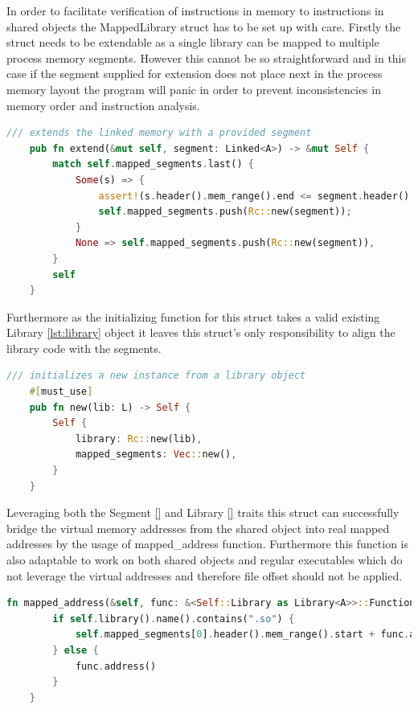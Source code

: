 In order to facilitate verification of instructions in memory to instructions in shared objects the MappedLibrary struct has to be set up with care.
Firstly the struct needs to be extendable as a single library can be mapped to multiple process memory segments.
However this cannot be so straightforward and in this case if the segment supplied for extension does not place next in the process memory layout the program will panic in order to prevent inconsistencies in memory order and instruction analysis.
\begin{lstlisting}[caption=\label{mapped_lib:extend}"The extend function for the MappedLibrary struct", language=Rust, breaklines=true]
/// extends the linked memory with a provided segment
    pub fn extend(&mut self, segment: Linked<A>) -> &mut Self {
        match self.mapped_segments.last() {
            Some(s) => {
                assert!(s.header().mem_range().end <= segment.header().mem_range().start);
                self.mapped_segments.push(Rc::new(segment));
            }
            None => self.mapped_segments.push(Rc::new(segment)),
        }
        self
    }
\end{lstlisting}
Furthermore as the initializing function for this struct takes a valid existing Library \ref{lst:library} object it leaves this struct's only responsibility to align the library code with the segments.
\begin{lstlisting}[caption=\label{mapped_lib:new}"The creator function for the MappedLibrary struct", language=Rust, breaklines=true]
 /// initializes a new instance from a library object
    #[must_use]
    pub fn new(lib: L) -> Self {
        Self {
            library: Rc::new(lib),
            mapped_segments: Vec::new(),
        }
    }
\end{lstlisting}

Leveraging both the Segment \ref{} and Library \ref{} traits this struct can successfully bridge the virtual memory addresses from the shared object into real mapped addresses by the usage of mapped\_address function.
Furthermore this function is also adaptable to work on both shared objects and regular executables which do not leverage the virtual addresses and therefore file offset should not be applied.

\begin{lstlisting}[caption=\label{mapped_lib:mapped_addr}"The mapped\_address function for the MappedLibrary struct", language=Rust, breaklines=true]
fn mapped_address(&self, func: &<Self::Library as Library<A>>::Function) -> u64 {
        if self.library().name().contains(".so") {
            self.mapped_segments[0].header().mem_range().start + func.address()
        } else {
            func.address()
        }
    }
\end{lstlisting}



